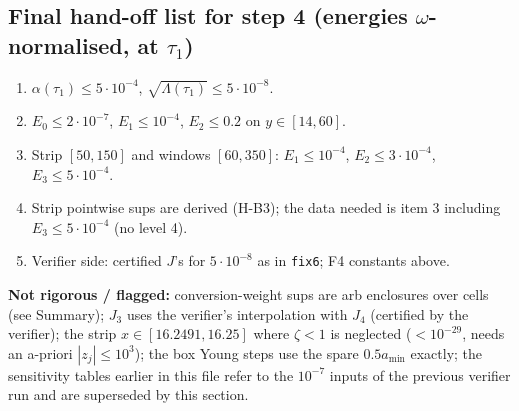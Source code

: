 \documentclass[11pt]{article}
\begin{document}
\subsection*{Final hand-off list for step 4 (energies $\omega$-normalised, at $\tau_1$)}
\begin{enumerate}
\item $\alpha(\tau_1)\le5\cdot10^{-4}$, $\sqrt{\Lambda(\tau_1)}\le5\cdot10^{-8}$.
\item $E_0\le2\cdot10^{-7}$, $E_1\le10^{-4}$, $E_2\le0.2$ on $y\in[14,60]$.
\item Strip $[50,150]$ and windows $[60,350]$: $E_1\le10^{-4}$, $E_2\le3\cdot10^{-4}$, $E_3\le5\cdot10^{-4}$.
\item Strip pointwise sups are derived (H-B3); the data needed is item 3 including $E_3\le5\cdot10^{-4}$ (no level 4).
\item Verifier side: certified $J$'s for $5\cdot10^{-8}$ as in \texttt{fix6}; F4 constants above.
\end{enumerate}
\textbf{Not rigorous / flagged:} conversion-weight sups are arb enclosures over cells (see Summary); $J_3$ uses the verifier's interpolation with $J_4$ (certified by the verifier); the strip $x\in[16.2491,16.25]$ where $\zeta<1$ is neglected ($<10^{-29}$, needs an a-priori $|z_j|\le10^3$); the box Young steps use the spare $0.5a_{\min}$ exactly; the sensitivity tables earlier in this file refer to the $10^{-7}$ inputs of the previous verifier run and are superseded by this section.
\end{document}
